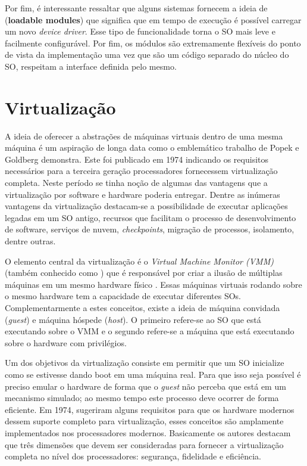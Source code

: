 Por fim, é interessante ressaltar que alguns sistemas fornecem a ideia de
 (\textbf{loadable modules}) que significa que em
tempo de execução é possível carregar um novo \emph{device driver}. Esse tipo
de funcionalidade torna o SO mais leve e facilmente configurável. Por fim, os
módulos são extremamente flexíveis do ponto de vista da implementação uma vez
que são um código separado do núcleo do SO, respeitam a interface definida pelo
mesmo.

\section{Virtualização}
\label{sec:virtualizacao}


A ideia de oferecer a abstrações de máquinas virtuais dentro de uma mesma
máquina é um aspiração de longa data como o emblemático trabalho de Popek e
Goldberg \cite{popek} demonstra. Este foi publicado em 1974 indicando os
requisitos necessários para a terceira geração processadores fornecessem
virtualização completa. Neste período se tinha noção de algumas das vantagens
que a virtualização por software e hardware poderia entregar. Dentre as
inúmeras vantagens da virtualização destacam-se a possibilidade de executar
aplicações legadas em um SO antigo, recursos que facilitam o processo de
desenvolvimento de software, serviços de nuvem, \emph{checkpoints}, migração de
processos, isolamento, dentre outras.

O elemento central da virtualização é o \emph{Virtual Machine Monitor (VMM)}
(também conhecido como ) que é responsável por criar a
ilusão de múltiplas máquinas em um mesmo hardware físico \cite{tanenbaum}.
Essas máquinas virtuais rodando sobre o mesmo hardware tem a capacidade de
executar diferentes SOs. Complementarmente a estes conceitos, existe a ideia de
máquina convidada (\emph{guest}) e máquina hóspede (\emph{host}). O primeiro
refere-se ao SO que está executando sobre o VMM e o segundo refere-se a máquina
que está executando sobre o hardware com privilégios.

Um dos objetivos da virtualização consiste em permitir que um SO inicialize
como se estivesse dando boot em uma máquina real. Para que isso seja possível é
preciso emular o hardware de forma que o \emph{guest} não perceba que está em
um mecanismo simulado; ao mesmo tempo este processo deve ocorrer de forma
eficiente. Em 1974, \citep{popek} sugeriram alguns requisitos para que os
hardware modernos dessem suporte completo para virtualização, esses conceitos
são amplamente implementados nos processadores modernos. Basicamente os autores
destacam que três dimensões que devem ser consideradas para fornecer a
virtualização completa no nível dos processadores: segurança, fidelidade e
eficiência.

